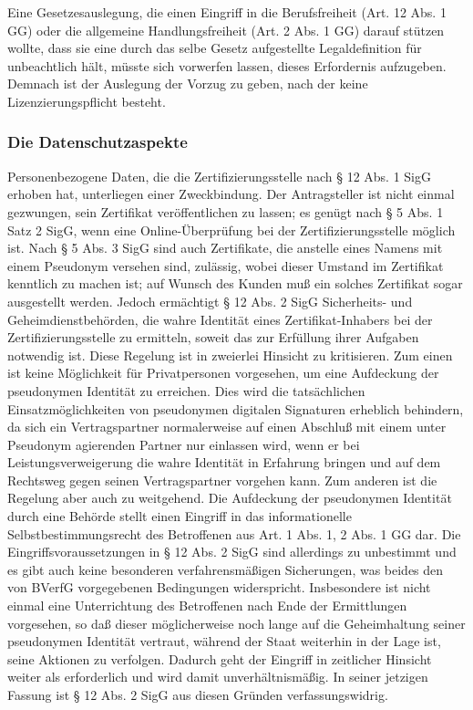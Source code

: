Eine Gesetzesauslegung, die einen Eingriff in die Berufsfreiheit (Art. 12 Abs. 1 GG) oder die allgemeine Handlungsfreiheit (Art. 2 Abs. 1 GG) darauf stützen wollte, dass sie eine durch das selbe Gesetz aufgestellte Legaldefinition für unbeachtlich hält, müsste sich vorwerfen lassen, dieses Erfordernis aufzugeben. Demnach ist der Auslegung der Vorzug zu geben, nach der keine Lizenzierungspflicht besteht.


\subsubsection{Die Datenschutzaspekte}
Personenbezogene Daten, die die Zertifizierungsstelle nach § 12 Abs. 1 SigG erhoben hat, unterliegen einer Zweckbindung. Der Antragsteller ist nicht einmal gezwungen, sein Zertifikat veröffentlichen zu lassen; es genügt nach § 5 Abs. 1 Satz 2 SigG, wenn eine Online-Überprüfung bei der Zertifizierungsstelle möglich ist. Nach § 5 Abs. 3 SigG sind auch Zertifikate, die anstelle eines Namens mit einem Pseudonym versehen sind, zulässig, wobei dieser Umstand im Zertifikat kenntlich zu machen ist; auf Wunsch des Kunden muß ein solches Zertifikat sogar ausgestellt werden. Jedoch ermächtigt § 12 Abs. 2 SigG Sicherheits- und Geheimdienstbehörden, die wahre Identität eines Zertifikat-Inhabers bei der Zertifizierungsstelle zu ermitteln, soweit das zur Erfüllung ihrer Aufgaben notwendig ist. Diese Regelung ist in zweierlei Hinsicht zu kritisieren. Zum einen ist keine Möglichkeit für Privatpersonen vorgesehen, um eine Aufdeckung der pseudonymen Identität zu erreichen. Dies wird die tatsächlichen Einsatzmöglichkeiten von pseudonymen digitalen Signaturen erheblich behindern, da sich ein Vertragspartner normalerweise auf einen Abschluß mit einem unter Pseudonym agierenden Partner nur einlassen wird, wenn er bei Leistungsverweigerung die wahre Identität in Erfahrung bringen und auf dem Rechtsweg gegen seinen Vertragspartner vorgehen kann. Zum anderen ist die Regelung aber auch zu weitgehend. Die Aufdeckung der pseudonymen Identität durch eine Behörde stellt einen Eingriff in das informationelle Selbstbestimmungsrecht des Betroffenen aus Art. 1 Abs. 1, 2 Abs. 1 GG dar. Die Eingriffsvoraussetzungen in § 12 Abs. 2 SigG sind allerdings zu unbestimmt und es gibt auch keine besonderen verfahrensmäßigen Sicherungen, was beides den von BVerfG vorgegebenen Bedingungen widerspricht. Insbesondere ist nicht einmal eine Unterrichtung des Betroffenen nach Ende der Ermittlungen vorgesehen, so daß dieser möglicherweise noch lange auf die Geheimhaltung seiner pseudonymen Identität vertraut, während der Staat weiterhin in der Lage ist, seine Aktionen zu verfolgen. Dadurch geht der Eingriff in zeitlicher Hinsicht weiter als erforderlich und wird damit unverhältnismäßig. In seiner jetzigen Fassung ist § 12 Abs. 2 SigG aus diesen Gründen verfassungswidrig.

